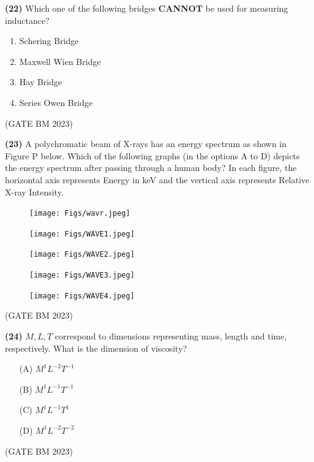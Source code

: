 \documentclass[journal]{IEEEtran}
\numberwithin{equation}{enumi}
\numberwithin{figure}{enumi}
\begin{document}
\textbf{(22)} Which one of the following bridges \textbf{CANNOT} be used for measuring inductance?

\begin{enumerate}[label=(\Alph*)]
    \item Schering Bridge 
    \item Maxwell Wien Bridge
    \item Hay Bridge
    \item Series Owen Bridge
\end{enumerate}
\hfill (GATE BM 2023)

\noindent
\textbf{(23)} A polychromatic beam of X-rays has an energy spectrum as shown in Figure P below. Which of the following graphs (in the options A to D) depicts the energy spectrum after passing through a human body? In each figure, the horizontal axis represents Energy in keV and the vertical axis represents Relative X-ray Intensity.
\begin{figure}[H]
\centering
\texttt{[image: Figs/wavr.jpeg]}
\caption{}
\end{figure}

\begin{figure}[H]
\centering
\texttt{[image: Figs/WAVE1.jpeg]}
\caption{}
\end{figure}

\begin{figure}[H]
\centering
\texttt{[image: Figs/WAVE2.jpeg]}
\caption{}
\end{figure}

\begin{figure}[H]
\centering
\texttt{[image: Figs/WAVE3.jpeg]}
\caption{}
\end{figure}

\begin{figure}[H]
\centering
\texttt{[image: Figs/WAVE4.jpeg]}
\caption{}
\end{figure}
\hfill (GATE BM 2023)

\textbf{(24)} \( M, L, T \) correspond to dimensions representing mass, length and time, respectively. What is the dimension of viscosity?

\begin{enumerate}
    \item[(A)] \( M^1 L^{-2} T^{-1} \)
    \item[(B)] \( M^1 L^{-1} T^{-1} \)
    \item[(C)] \( M^1 L^{-1} T^{1} \)
    \item[(D)] \( M^1 L^{-2} T^{-2} \)
\end{enumerate}
\hfill (GATE BM 2023)
\end{document}
